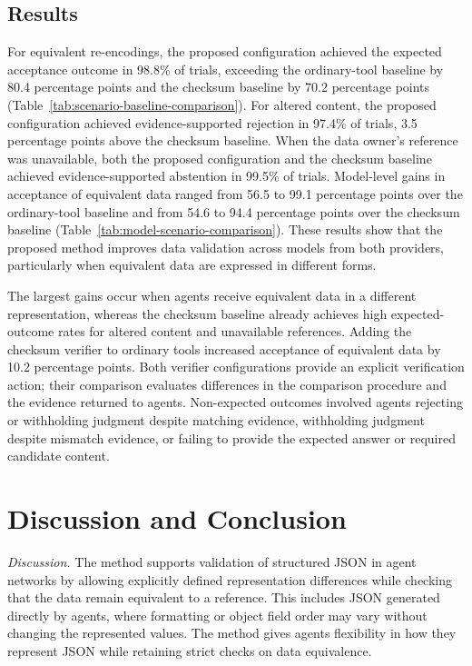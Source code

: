 \documentclass[conference]{IEEEtran}
\begin{document}
\subsection{Results}
For equivalent re-encodings, the proposed configuration achieved the expected acceptance outcome in 98.8\% of trials, exceeding the ordinary-tool baseline by 80.4 percentage points and the checksum baseline by 70.2 percentage points (Table~\ref{tab:scenario-baseline-comparison}).
For altered content, the proposed configuration achieved evidence-supported rejection in 97.4\% of trials, 3.5 percentage points above the checksum baseline.
When the data owner's reference was unavailable, both the proposed configuration and the checksum baseline achieved evidence-supported abstention in 99.5\% of trials.
Model-level gains in acceptance of equivalent data ranged from 56.5 to 99.1 percentage points over the ordinary-tool baseline and from 54.6 to 94.4 percentage points over the checksum baseline (Table~\ref{tab:model-scenario-comparison}).
These results show that the proposed method improves data validation across models from both providers, particularly when equivalent data are expressed in different forms.

The largest gains occur when agents receive equivalent data in a different representation, whereas the checksum baseline already achieves high expected-outcome rates for altered content and unavailable references.
Adding the checksum verifier to ordinary tools increased acceptance of equivalent data by 10.2 percentage points.
Both verifier configurations provide an explicit verification action; their comparison evaluates differences in the comparison procedure and the evidence returned to agents.
Non-expected outcomes involved agents rejecting or withholding judgment despite matching evidence, withholding judgment despite mismatch evidence, or failing to provide the expected answer or required candidate content.

\section{Discussion and Conclusion}
\label{sec:limits}
\emph{Discussion.} The method supports validation of structured JSON in agent networks by allowing explicitly defined representation differences while checking that the data remain equivalent to a reference.
This includes JSON generated directly by agents, where formatting or object field order may vary without changing the represented values.
The method gives agents flexibility in how they represent JSON while retaining strict checks on data equivalence.
\end{document}
